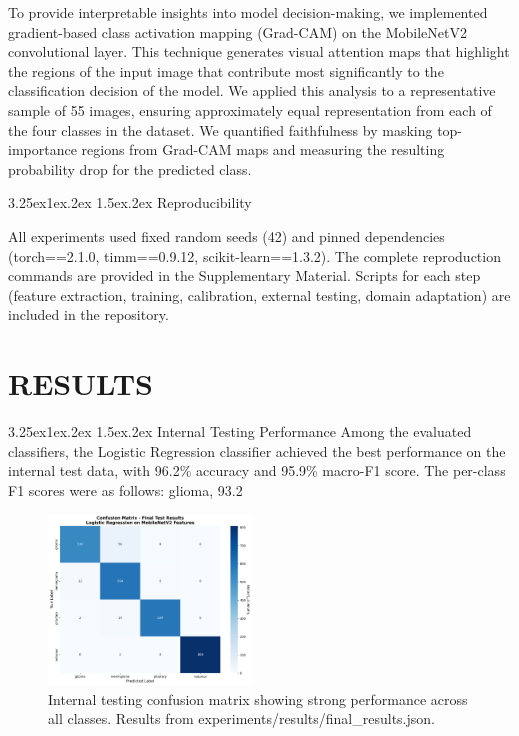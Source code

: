 \documentclass[conference]{IEEEtran}
\makeatletter
\renewcommand{\subsection}{%
  \@startsection{subsection}{2}{\z@}%
  {3.25ex\@plus1ex\@minus.2ex}%
  {1.5ex\@plus.2ex}%
  {\normalfont}%
}
\makeatother
\begin{document}
To provide interpretable insights into model decision-making, we implemented gradient-based class activation mapping (Grad-CAM) \cite{selvaraju2017} on the MobileNetV2 convolutional layer. This technique generates visual attention maps that highlight the regions of the input image that contribute most significantly to the classification decision of the model. We applied this analysis to a representative sample of 55 images, ensuring approximately equal representation from each of the four classes in the dataset. We quantified faithfulness by masking top-importance regions from Grad-CAM maps and measuring the resulting probability drop for the predicted class.

\subsection{\normalfont Reproducibility}

All experiments used fixed random seeds (42) and pinned dependencies (torch==2.1.0, timm==0.9.12, scikit-learn==1.3.2). The complete reproduction commands are provided in the Supplementary Material. Scripts for each step (feature extraction, training, calibration, external testing, domain adaptation) are included in the repository.

\section{RESULTS}
\subsection{\normalfont Internal Testing Performance}
Among the evaluated classifiers, the Logistic Regression classifier achieved the best performance on the internal test data, with 96.2\% accuracy and 95.9\% macro-F1 score. The per-class F1 scores were as follows: glioma, 93.2%

\begin{figure}[!t]
\centering
\includegraphics[width=0.48\textwidth]{figs_paper/Figure1_Internal_Confusion_Matrix.png}
\caption{Internal testing confusion matrix showing strong performance across all classes. Results from experiments/results/final\_results.json.}
\label{fig:confusion_matrix}
\end{figure}
\end{document}
